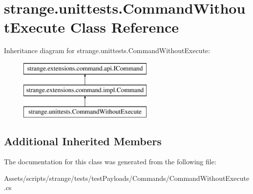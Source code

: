 \hypertarget{classstrange_1_1unittests_1_1_command_without_execute}{\section{strange.\-unittests.\-Command\-Without\-Execute Class Reference}
\label{classstrange_1_1unittests_1_1_command_without_execute}
}
Inheritance diagram for strange.\-unittests.\-Command\-Without\-Execute\-:\begin{figure}[H]
\begin{center}
\leavevmode
\includegraphics[height=3.000000cm]{classstrange_1_1unittests_1_1_command_without_execute}
\end{center}
\end{figure}
\subsection*{Additional Inherited Members}


The documentation for this class was generated from the following file\-:\begin{DoxyCompactItemize}
\item 
Assets/scripts/strange/tests/test\-Payloads/\-Commands/Command\-Without\-Execute.\-cs\end{DoxyCompactItemize}

